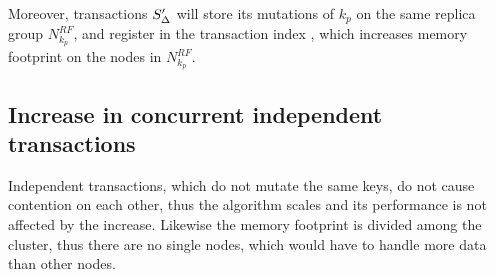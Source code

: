 Moreover, transactions $S'_{\text{$\Delta$}}$ will store its mutations of $k_p$ on the same replica group $N^{RF}_{k_p}$, and register in the transaction index \txIndex, which increases memory footprint on the nodes in $N^{RF}_{k_p}$.

\subsection{Increase in concurrent independent transactions}
Independent transactions, which do not mutate the same keys, do not cause contention on each other, thus the algorithm
scales and its performance is not affected by the increase. Likewise the memory footprint is divided among the cluster, thus there are no single nodes, which would have to handle more data than other nodes.

